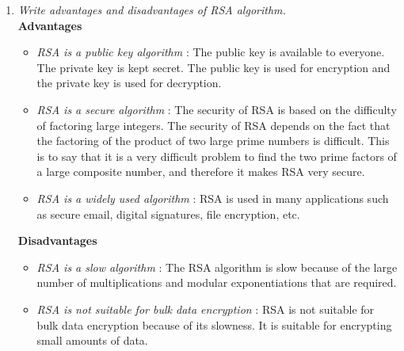 \documentclass[11pt]{article}
\begin{document}
\begin{enumerate}
	\item \textit{Write advantages and disadvantages of RSA algorithm.}\\
	
	      \textbf{Advantages}
	      \begin{itemize}
		      \item \textit{RSA is a public key algorithm} : The public key is available to everyone. The private key is kept secret. The public key is used for encryption and the private key is used for decryption.
		      \item \textit{RSA is a secure algorithm} : The security of RSA is based on the difficulty of factoring large integers. The security of RSA depends on the fact that the factoring of the product of two large prime numbers is difficult. This is to say that it is a very difficult problem to find the two prime factors of a large composite number, and therefore it makes RSA very secure.
		      \item \textit{RSA is a widely used algorithm} : RSA is used in many applications such as secure email, digital signatures, file encryption, etc.
	      \end{itemize}
	      \textbf{Disadvantages}
	      \begin{itemize}
		      \item \textit{RSA is a slow algorithm} : The RSA algorithm is slow because of the large number of multiplications and modular exponentiations that are required.
		      \item \textit{RSA is not suitable for bulk data encryption} : RSA is not suitable for bulk data encryption because of its slowness. It is suitable for encrypting small amounts of data.
	      \end{itemize}
\end{enumerate}
\end{document}
